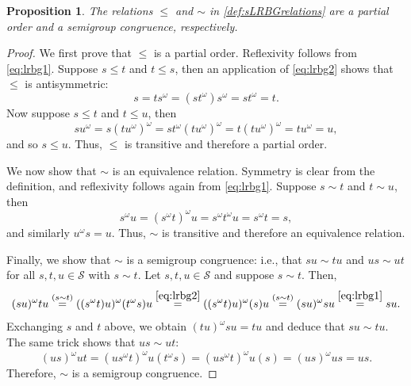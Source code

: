 \documentclass[11pt, oneside, reqno]{amsart}
\newtheorem{prop}[theorem]{Proposition}
\theoremstyle{definition}
\numberwithin{equation}{section}
\def \SS{{\mathcal{S}}}
\begin{document}
\begin{prop}
    The relations $\leq$ and $\sim$ in \cref{def:sLRBGrelations} are a partial order and a semigroup congruence, respectively.
\end{prop}

\begin{proof}
    We first prove that $\leq$ is a partial order.
    Reflexivity follows from \cref{eq:lrbg1}.
    Suppose $s \leq t$ and $t \leq s$, then an application of \cref{eq:lrbg2} shows that $\leq$ is antisymmetric:
    \[
        s = t s^\omega = (s t^\omega) s^\omega = s t^\omega = t.
    \]
    Now suppose $s \leq t$ and $t \leq u$, then
    \[
        s u^\omega = s (t u^\omega)^\omega = s t^\omega (t u^\omega)^\omega = t (t u^\omega)^\omega = t u^\omega = u,
    \]
    and so $s \leq u$. Thus, $\leq$ is transitive and therefore a partial order.

    We now show that $\sim$ is an equivalence relation.
    Symmetry is clear from the definition, and reflexivity follows again from \cref{eq:lrbg1}.
    Suppose $s \sim t$ and $t \sim u$, then
    \[
        s^\omega u = (s^\omega t)^\omega u = s^\omega t^\omega u = s^\omega t = s,
    \]
    and similarly $u^\omega s = u$. Thus, $\sim$ is transitive and therefore an equivalence relation.

    Finally, we show that $\sim$ is a semigroup congruence:
    i.e., that $su \sim tu$ and $us \sim ut$ for all $s,t,u \in \SS$ with $s \sim t$.
    Let $s,t,u \in \SS$ and suppose $s \sim t$.
    Then,
    \begin{equation*}
        (s u)^\omega t u                                    \overset{(s \sim t)}{=} 
        ( (s^\omega t) u )^\omega ( t^\omega s ) u          \overset{\cref{eq:lrbg2}}{=}
        ( (s^\omega t) u )^\omega ( s ) u                   \overset{(s \sim t)}{=} 
        (s u)^\omega s u                                    \overset{\cref{eq:lrbg1}}{=}
        s u.
    \end{equation*}
    Exchanging $s$ and $t$ above, we obtain $(t u)^\omega s u = t u$ and deduce that $s u \sim t u$.
    The same trick shows that $u s \sim u t$:
    \[
        (u s)^\omega u t = (u s^\omega t)^\omega u (t^\omega s) = (u s^\omega t)^\omega u (s) = (u s)^\omega u s = u s.
    \]
    Therefore, $\sim$ is a semigroup congruence.
\end{proof}
\end{document}
